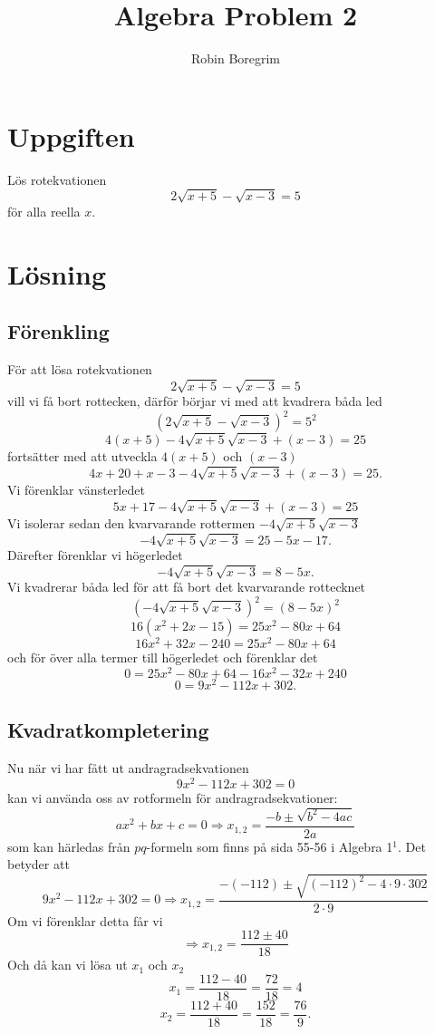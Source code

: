 \documentclass[11pt]{article}
\begin{document}
\title{Algebra Problem 2}
\author{Robin Boregrim}
\maketitle
\renewcommand{\contentsname}{Innehållsförteckning}
\tableofcontents
\newpage

\section{Uppgiften}
Lös rotekvationen $$2\sqrt{x+5}-\sqrt{x-3} = 5$$ för alla reella $x$.
\section{Lösning}
\subsection{Förenkling}
För att lösa rotekvationen
$$2\sqrt{x+5}-\sqrt{x-3} = 5$$ 
vill vi få bort rottecken, därför börjar vi med att kvadrera båda led
$$(2\sqrt{x+5}-\sqrt{x-3})^2 = 5^2$$ 
$$4(x+5) - 4\sqrt{x+5}\sqrt{x-3} +(x-3) = 25$$
fortsätter med att utveckla $4(x+5)$ och $(x-3)$
$$4x+ 20 + x - 3 - 4\sqrt{x+5}\sqrt{x-3} +(x-3) = 25.$$
Vi förenklar vänsterledet
$$5x + 17 - 4\sqrt{x+5}\sqrt{x-3} +(x-3) = 25$$
Vi isolerar sedan den kvarvarande rottermen  $ - 4\sqrt{x+5}\sqrt{x-3}$
$$- 4\sqrt{x+5}\sqrt{x-3}= 25 - 5x - 17. $$
Därefter förenklar vi högerledet
$$- 4\sqrt{x+5}\sqrt{x-3} = 8 - 5x.$$
Vi kvadrerar båda led för att få bort det kvarvarande rottecknet
$$ (-4\sqrt{x+5}\sqrt{x-3})^2 = (8 - 5x)^2$$
$$ 16(x^2 + 2x -15) = 25x^2-80x+64$$
$$ 16x^2 + 32x - 240 = 25x^2-80x+64$$
och för över alla termer till högerledet och förenklar det
$$ 0 = 25x^2-80x+64 - 16x^2 - 32x + 240$$
$$ 0 = 9x^2-112x+302.$$
\subsection{Kvadratkompletering}
Nu när vi har fått ut andragradsekvationen $$9x^2-112x+302=0$$ kan vi använda oss av rotformeln för andragradsekvationer:
$$ax^2 + bx + c = 0 \Rightarrow x_{1,2} = \frac{-b \pm \sqrt{b^2 - 4ac}}{2a}$$
som kan härledas från $pq$-formeln som finns på sida 55-56 i Algebra 1$^1$.
Det betyder att
$$9x^2-112x+302 = 0 \Rightarrow x_{1,2} = \frac{-(-112) \pm \sqrt{(-112)^2 - 4 \cdot 9 \cdot 302}}{2 \cdot 9}$$
Om vi förenklar detta får vi
$$\Rightarrow x_{1,2} = \frac{ 112 \pm 40}{18}$$
Och då kan vi lösa ut $x_1$ och $x_2$
$$x_1 = \frac{ 112 - 40}{18} = \frac{72}{18} = 4$$
$$x_2 = \frac{ 112 + 40}{18} = \frac{152}{18} = \frac{76}{9}.$$
\newpage
\end{document}
